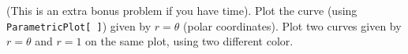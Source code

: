 \problem (This is an extra bonus problem if you have time).  Plot
the curve (using {\tt ParametricPlot[ ]}) 
given by $r = \theta$ (polar coordinates).  Plot
two curves given by $r = \theta$ and $r = 1$ on the same plot, using
two different color. 
 

\bye
